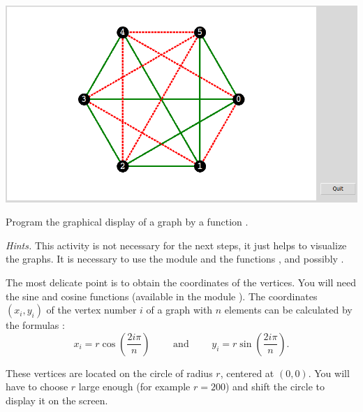\documentclass[11pt,class=report,crop=false]{standalone}
\begin{document}
\begin{activite}


\begin{center}
\includegraphics[scale=\myscale,scale=0.4]{screen-ramsey-2-en}
\end{center}


Program the graphical display of a graph by a function .
     
\bigskip
     
\emph{Hints.} This activity is not necessary for the next steps, it just helps to visualize the graphs. It is necessary to use the module  and the functions ,  and possibly . 

The most delicate point is to obtain the coordinates of the vertices. You will need the sine and cosine functions (available in the module ).
The coordinates $(x_i,y_i)$ of the vertex number $i$ of a graph with $n$ elements can be calculated by the formulas :
$$x_i = r \cos\left(\frac{2 i \pi}{n}\right) \qquad \text{ and } \qquad y_i = r\sin\left(\frac{2 i \pi}{n}\right).$$

These vertices are located on the circle of radius $r$, centered at $(0,0)$. 
You will have to choose $r$ large enough (for example $r=200$) and shift the circle to display it on the screen.


\end{activite}

\end{document}

